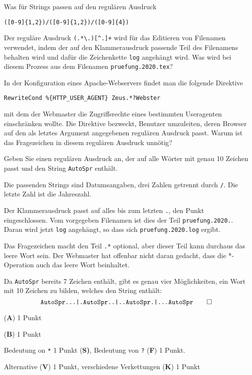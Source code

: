 \begin{teilaufgaben}
\item Was für Strings passen auf den regulären Ausdruck
\begin{verbatim}
([0-9]{1,2})/([0-9]{1,2})/([0-9]{4})
\end{verbatim}
\item
Der reguläre Ausdruck \texttt{(.*\textbackslash.)[\textasciicircum.]+} wird
für das Editieren von Filenamen verwendet, indem der auf den Klammerausdruck
passende Teil des Filenamens behalten wird und dafür die Zeichenkette
\texttt{log} angehängt wird.
Was wird bei diesem Prozess aus dem Filenamen \texttt{pruefung.2020.tex}?
\item
In der Konfiguration eines Apache-Webservers findet man die
folgende Direktive
\begin{verbatim}
RewriteCond %{HTTP_USER_AGENT} Zeus.*?Webster
\end{verbatim}
mit dem der Webmaster die Zugriffsrechte eines bestimmten Useragenten
einschränken wollte.
Die Direktive bezweckt, Benutzer umzuleiten, deren Browser auf den als
letztes Argument angegebenen regulären Ausdruck passt.
Warum ist das Fragezeichen in diesem regulären Ausdruck unnötig?
\item
Geben Sie einen regulären Ausdruck an, der auf alle Wörter mit genau
10 Zeichen passt und den String \texttt{AutoSpr} enthält.
\end{teilaufgaben}


\begin{loesung}
\begin{teilaufgaben}
\item Die passenden Strings sind Datumsangaben, drei Zahlen getrennt durch
\texttt{/}.
Die letzte Zahl ist die Jahreszahl.
\item Der Klammerausdruck passt auf alles bis zum letzten \texttt{.},
den Punkt eingeschlossen.
Vom vorgegeben Filenamen ist dies der Teil \texttt{pruefung.2020.}.
Daran wird jetzt \texttt{log} angehängt, so dass sich
\texttt{pruefung.2020.log} ergibt.
\item Das Fragezeichen macht den Teil \texttt{.*} optional, aber dieser
Teil kann durchaus das leere Wort sein.
Der Webmaster hat offenbar nicht daran gedacht, dass die *-Operation
auch das leere Wort beinhaltet.
\item Da \texttt{AutoSpr} bereits 7 Zeichen enthält, gibt es genau vier
Möglichkeiten, ein Wort mit 10 Zeichen zu bilden, welches den String
enthält:
\[
\texttt{AutoSpr...|.AutoSpr..|..AutoSpr.|...AutoSpr}
\qedhere
\]
\end{teilaufgaben}
\end{loesung}

\begin{bewertung}
\begin{teilaufgaben}
\item ({\bf A}) 1 Punkt
\item ({\bf B}) 1 Punkt
\item Bedeutung on \texttt{*} 1 Punkt {(\bf S)},
Bedeutung von \texttt{?} ({\bf F}) 1 Punkt.
\item Alternative ({\bf V}) 1 Punkt, verschiedene Verkettungen ({\bf K}) 1 Punkt
\end{teilaufgaben}
\end{bewertung}


